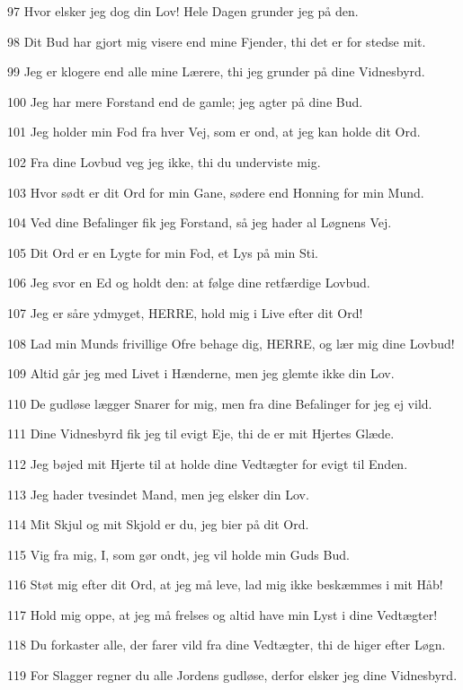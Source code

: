 \par 97 Hvor elsker jeg dog din Lov! Hele Dagen grunder jeg på den.
\par 98 Dit Bud har gjort mig visere end mine Fjender, thi det er for stedse mit.
\par 99 Jeg er klogere end alle mine Lærere, thi jeg grunder på dine Vidnesbyrd.
\par 100 Jeg har mere Forstand end de gamle; jeg agter på dine Bud.
\par 101 Jeg holder min Fod fra hver Vej, som er ond, at jeg kan holde dit Ord.
\par 102 Fra dine Lovbud veg jeg ikke, thi du underviste mig.
\par 103 Hvor sødt er dit Ord for min Gane, sødere end Honning for min Mund.
\par 104 Ved dine Befalinger fik jeg Forstand, så jeg hader al Løgnens Vej.
\par 105 Dit Ord er en Lygte for min Fod, et Lys på min Sti.
\par 106 Jeg svor en Ed og holdt den: at følge dine retfærdige Lovbud.
\par 107 Jeg er såre ydmyget, HERRE, hold mig i Live efter dit Ord!
\par 108 Lad min Munds frivillige Ofre behage dig, HERRE, og lær mig dine Lovbud!
\par 109 Altid går jeg med Livet i Hænderne, men jeg glemte ikke din Lov.
\par 110 De gudløse lægger Snarer for mig, men fra dine Befalinger for jeg ej vild.
\par 111 Dine Vidnesbyrd fik jeg til evigt Eje, thi de er mit Hjertes Glæde.
\par 112 Jeg bøjed mit Hjerte til at holde dine Vedtægter for evigt til Enden.
\par 113 Jeg hader tvesindet Mand, men jeg elsker din Lov.
\par 114 Mit Skjul og mit Skjold er du, jeg bier på dit Ord.
\par 115 Vig fra mig, I, som gør ondt, jeg vil holde min Guds Bud.
\par 116 Støt mig efter dit Ord, at jeg må leve, lad mig ikke beskæmmes i mit Håb!
\par 117 Hold mig oppe, at jeg må frelses og altid have min Lyst i dine Vedtægter!
\par 118 Du forkaster alle, der farer vild fra dine Vedtægter, thi de higer efter Løgn.
\par 119 For Slagger regner du alle Jordens gudløse, derfor elsker jeg dine Vidnesbyrd.
